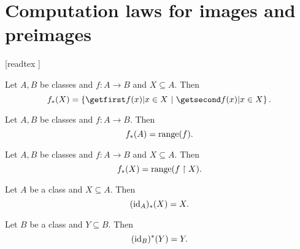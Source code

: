 \documentclass[../../set-theory/set-theory.tex]{subfiles}
\begin{document}
  \chapter{Computation laws for images and preimages}\label{image-and-preimage}


  \begin{forthel}

    [readtex ]

  \end{forthel}

  \begin{forthel}
    \begin{proposition}
      Let $A, B$ be classes and $f : A \to B$ and $X \subseteq A$.
      Then \[ f_{*}(X) = \class{ f(x) | x \in X }. \]
    \end{proposition}
  \end{forthel}

  \begin{forthel}
    \begin{corollary}
      Let $A, B$ be classes and $f : A \to B$.
      Then \[ f_{*}(A) = \operatorname{range}(f). \]
    \end{corollary}
  \end{forthel}

  \begin{forthel}
    \begin{corollary}
      Let $A, B$ be classes and $f : A \to B$ and $X \subseteq A$.
      Then \[ f_{*}(X) = \operatorname{range}(f \restriction X). \]
    \end{corollary}
  \end{forthel}

  \begin{forthel}
    \begin{proposition}
      Let $A$ be a class and $X \subseteq A$.
      Then \[ (\operatorname{id}_{A})_{*}(X) = X. \]
    \end{proposition}
  \end{forthel}

  \begin{forthel}
    \begin{proposition}
      Let $B$ be a class and $Y \subseteq B$.
      Then \[ (\operatorname{id}_{B})^{*}(Y) = Y. \]
    \end{proposition}
  \end{forthel}
\end{document}
